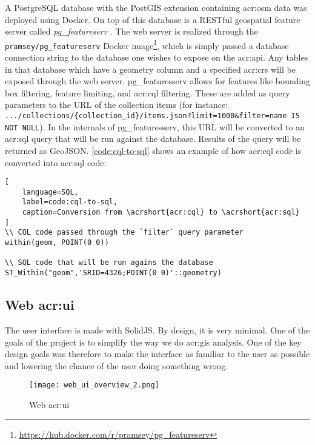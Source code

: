 A PostgreSQL database with the PostGIS extension containing \gls{acr:osm} data was deployed using Docker. On top of this database is a RESTful geospatial feature server called \textit{pg\_featureserv} \citep{crunchydataCrunchyDataPg_featureserv2024}. The web server is realized through the \texttt{pramsey/pg\_featureserv} Docker image\footnote{\url{https://hub.docker.com/r/pramsey/pg_featureserv}}, which is simply passed a database connection string to the database one wishes to expose on the \acrshort{acr:api}. Any tables in that database which have a geometry column and a specified \gls{acr:crs} will be exposed through the web server. pg\_featuresserv allows for features like bounding box filtering, feature limiting, and \acrshort{acr:cql} filtering. These are added as query parameters to the URL of the collection items (for instance: \texttt{.../collections/\{collection\_id\}/items.json?limit=1000\&filter=name IS NOT NULL}). In the internals of pg\_featuresserv, this URL will be converted to an \acrshort{acr:sql} query that will be run against the database. Results of the query will be returned as GeoJSON. \autoref{code:cql-to-sql} shows an example of how \acrshort{acr:cql} code is converted into \acrshort{acr:sql} code:

\begin{lstlisting}[
    language=SQL,
    label=code:cql-to-sql,
    caption=Conversion from \acrshort{acr:cql} to \acrshort{acr:sql}
]
\\ CQL code passed through the `filter` query parameter
within(geom, POINT(0 0))

\\ SQL code that will be run agains the database
ST_Within("geom",'SRID=4326;POINT(0 0)'::geometry)
\end{lstlisting}

\subsection[Web UI]{Web \acrshort{acr:ui}}

The user interface is made with SolidJS. By design, it is very minimal. One of the goals of the project is to simplify the way we do \acrshort{acr:gis} analysis. One of the key design goals was therefore to make the interface as familiar to the user as possible and lowering the chance of the user doing something wrong.

\begin{figure}[h]
    \centering
    \texttt{[image: web\_ui\_overview\_2.png]}
    \caption{Web \acrshort{acr:ui}}
    \label{fig:web-ui}
\end{figure}

